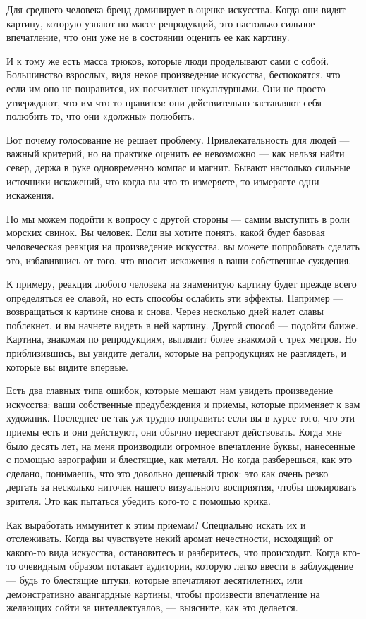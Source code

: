 \documentclass[ebook,12pt,oneside,openany]{memoir}
\begin{document}
Для среднего человека бренд доминирует в оценке искусства. Когда они
видят картину, которую узнают по массе репродукций, это настолько
сильное впечатление, что они уже не в состоянии оценить ее как
картину.

И к тому же есть масса трюков, которые люди проделывают сами с собой.
Большинство взрослых, видя некое произведение искусства, беспокоятся,
что если им оно не понравится, их посчитают некультурными. Они не
просто утверждают, что им что-то нравится: они действительно
заставляют себя полюбить то, что они «должны» полюбить.

Вот почему голосование не решает проблему. Привлекательность для людей
— важный критерий, но на практике оценить ее невозможно — как нельзя
найти север, держа в руке одновременно компас и магнит. Бывают
настолько сильные источники искажений, что когда вы что-то измеряете,
то измеряете одни искажения.

Но мы можем подойти к вопросу с другой стороны — самим выступить в
роли морских свинок. Вы человек. Если вы хотите понять, какой будет
базовая человеческая реакция на произведение искусства, вы можете
попробовать сделать это, избавившись от того, что вносит искажения в
ваши собственные суждения.

К примеру, реакция любого человека на знаменитую картину будет прежде
всего определяться ее славой, но есть способы ослабить эти эффекты.
Например — возвращаться к картине снова и снова. Через несколько дней
налет славы поблекнет, и вы начнете видеть в ней картину. Другой
способ — подойти ближе. Картина, знакомая по репродукциям, выглядит
более знакомой с трех метров. Но приблизившись, вы увидите детали,
которые на репродукциях не разглядеть, и которые вы видите впервые.

Есть два главных типа ошибок, которые мешают нам увидеть произведение
искусства: ваши собственные предубеждения и приемы, которые применяет
к вам художник. Последнее не так уж трудно поправить: если вы в курсе
того, что эти приемы есть и они действуют, они обычно перестают
действовать. Когда мне было десять лет, на меня производили огромное
впечатление буквы, нанесенные с помощью аэрографии и блестящие, как
металл. Но когда разберешься, как это сделано, понимаешь, что это
довольно дешевый трюк: это как очень резко дергать за несколько
ниточек нашего визуального восприятия, чтобы шокировать зрителя. Это
как пытаться убедить кого-то с помощью крика.

Как выработать иммунитет к этим приемам? Специально искать их и
отслеживать. Когда вы чувствуете некий аромат нечестности, исходящий
от какого-то вида искусства, остановитесь и разберитесь, что
происходит. Когда кто-то очевидным образом потакает аудитории, которую
легко ввести в заблуждение — будь то блестящие штуки, которые
впечатляют десятилетних, или демонстративно авангардные картины, чтобы
произвести впечатление на желающих сойти за интеллектуалов, —
выясните, как это делается.
\end{document}
